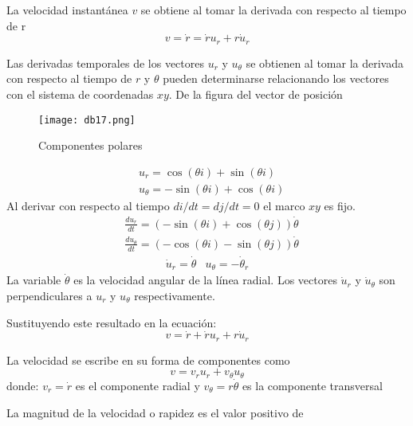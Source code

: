 \begin{definition}[Velocidad]
    La velocidad instantánea $v$ se obtiene al tomar la derivada con respecto al tiempo de r
    \begin{equation}
        v=\dot{r}=\dot{r}u_r+r\dot{u}_r
    \end{equation}
\end{definition}

Las derivadas temporales de los vectores $u_r$ y $u_{\theta}$ se obtienen al tomar la derivada con respecto al tiempo de $r$ y $\theta$ pueden determinarse relacionando los vectores con el sistema de coordenadas $xy$. De la figura del vector de posición

\begin{figure}[h!]
  \centerline{\texttt{[image: db17.png]}}
  \caption{Componentes polares}
  \label{db17}
\end{figure}

\begin{align}
    &u_r=\cos{(\theta i)}+\sin{(\theta i)}\\
    &u_{\theta}=-\sin{(\theta i)}+\cos{(\theta i)}
\end{align}
Al derivar con respecto al tiempo $di/dt=dj/dt=0$ el marco $xy$ es fijo.
\begin{align*}
    &\frac{du_r}{dt}=\left(-\sin{(\theta i)}+\cos{(\theta j)}\right)\dot{\theta}\\
    &\frac{du_{\theta}}{dt}=\left(-\cos{(\theta i)}-\sin{(\theta j)}\right)\dot{\theta}
\end{align*}
\begin{align*}
\dot{u}_r=\dot{\theta}&u_{\theta}=-\dot{\theta}_r
\end{align*}
La variable $\dot{\theta}$ es la velocidad angular de la línea radial. Los vectores $\dot{u}_r$ y $\dot{u}_{\theta}$ son perpendiculares a $u_r$ y $u_{\theta}$ respectivamente.

Sustituyendo este resultado en la ecuación: 
\begin{equation*}
    v=\dot{r}+\dot{r}u_r+r\dot{u}_r
\end{equation*}

La velocidad se escribe en su forma de componentes como
\begin{equation*}
    v=v_ru_r+v_{\theta}u_{\theta}
\end{equation*}
donde: 
$v_r=\dot{r}$ es el componente radial y $v_{\theta}=r\dot{\theta}$ es la componente transversal

La magnitud de la velocidad o rapidez es el valor positivo de

